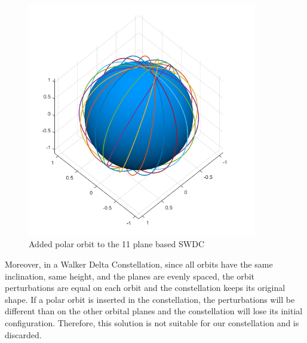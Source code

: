 \begin{figure}[H]
\includegraphics[width=10cm]{semiwalker11p1}
\centering
\caption{Added polar orbit to the 11 plane based SWDC}
\end{figure}

Moreover, in a Walker Delta Constellation, since all orbits have the same inclination, same height, and the planes are evenly spaced, the orbit perturbations are equal on each orbit and the constellation keeps its original shape. If a polar orbit is inserted in the constellation, the perturbations will be different than on the other orbital planes and the constellation will lose its initial configuration. Therefore, this solution is not suitable for our constellation and is discarded.